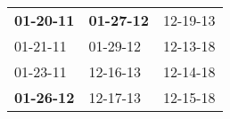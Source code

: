 \begin{supertabular}{p{0.33\columnwidth}p{0.33\columnwidth}p{0.33\columnwidth}}
 \textbf{01-20-11\textsuperscript{}} &  \textbf{01-27-12\textsuperscript{}} &  12-19-13\textsuperscript{} \\
          01-21-11\textsuperscript{} &           01-29-12\textsuperscript{} &  12-13-18\textsuperscript{} \\
          01-23-11\textsuperscript{} &           12-16-13\textsuperscript{} &  12-14-18\textsuperscript{} \\
 \textbf{01-26-12\textsuperscript{}} &           12-17-13\textsuperscript{} &  12-15-18\textsuperscript{} \\
\end{supertabular}
